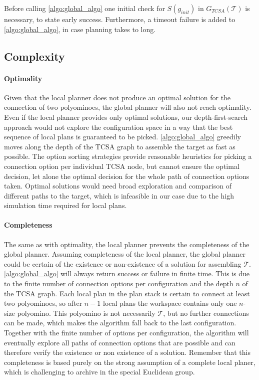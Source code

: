 Before calling \autoref{algo:global_algo} one initial check for $S(g_{init})$ in $G_{\textit{TCSA}}(\mathcal{T})$ is necessary, to state early success.
Furthermore, a timeout failure is added to \autoref{algo:global_algo}, in case planning takes to long.
 
\subsection{Complexity}
\label{sec:global_complex}

\paragraph{Optimality}

Given that the local planner does not produce an optimal solution for the connection of two polyominoes, the global planner will also not reach optimality.
Even if the local planner provides only optimal solutions, our depth-first-search approach would not explore the configuration space in a way that the best sequence of local plans is guaranteed to be picked.
\autoref{algo:global_algo} greedily moves along the depth of the TCSA graph to assemble the target as fast as possible.
The option sorting strategies provide reasonable heuristics for picking a connection option per individual TCSA node, but cannot ensure the optimal decision, let alone the optimal decision for the whole path of connection options taken.
Optimal solutions would need broad exploration and comparison of different paths to the target, which is infeasible in our case due to the high simulation time required for local plans.

\paragraph{Completeness}

The same as with optimality, the local planner prevents the completeness of the global planner.
Assuming completeness of the local planner, the global planner could be certain of the existence or non-existence of a solution for assembling $\mathcal{T}$.
\autoref{algo:global_algo} will always return success or failure in finite time.
This is due to the finite number of connection options per configuration and the depth $n$ of the TCSA graph.
Each local plan in the plan stack is certain to connect at least two polyominoes, so after $n-1$ local plans the workspace contains only one $n$-size polyomino.
This polyomino is not necessarily $\mathcal{T}$, but no further connections can be made, which makes the algorithm fall back to the last configuration.
Together with the finite number of options per configuration, the algorithm will eventually explore all paths of connection options that are possible and can therefore verify the existence or non existence of a solution.
Remember that this completeness is based purely on the strong assumption of a complete local planer, which is challenging to archive in the special Euclidean group.

